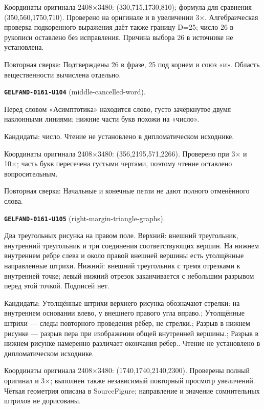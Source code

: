 Координаты оригинала 2408×3480: (330,715,1730,810); формула для сравнения (350,560,1750,710). Проверено на оригинале и в увеличении 3×. Алгебраическая проверка подкоренного выражения даёт также границу D=25; число 26 в рукописи оставлено без исправления. Причина выбора 26 в источнике не установлена.\par
Повторная сверка: Подтверждены 26 в фразе, 25 под корнем и союз «и». Область вещественности вычислена отдельно.\par\medskip
\par\noindent\leavevmode{}\label{GELFAND-0161-U104}\label{GELFAND-P001487:middle-cancelled-word}\textbf{\texttt{GELFAND-0161-U104}} (middle-cancelled-word).\nopagebreak[4]\par
Перед словом «Асимптотика» находится слово, густо зачёркнутое двумя наклонными линиями; нижние части букв похожи на «число».\par
Кандидаты: число. Чтение не установлено в дипломатическом исходнике.\par
Координаты оригинала 2408×3480: (356,2195,571,2266). Проверено при 3× и 10×; часть букв пересечена густыми чертами, поэтому чтение оставлено вопросительным.\par
Повторная сверка: Начальные и конечные петли не дают полного отменённого слова.\par\medskip
\par\noindent\leavevmode{}\label{GELFAND-0161-U105}\label{GELFAND-P001487:right-margin-triangle-graphs}\textbf{\texttt{GELFAND-0161-U105}} (right-margin-triangle-graphs).\nopagebreak[4]\par
Два треугольных рисунка на правом поле. Верхний: внешний треугольник, внутренний треугольник и три соединения соответствующих вершин. На нижнем внутреннем ребре слева и около правой внешней вершины есть утолщённые направленные штрихи. Нижний: внешний треугольник с тремя отрезками к внутренней точке; левый нижний отрезок заканчивается с небольшим разрывом перед этой точкой. Подписей нет.\par
Кандидаты: Утолщённые штрихи верхнего рисунка обозначают стрелки: на внутреннем основании влево, у внешнего правого угла вправо.; Утолщённые штрихи — следы повторного проведения рёбер, не стрелки.; Разрыв в нижнем рисунке — разрыв пера при изображении общей внутренней вершины.; Разрыв в нижнем рисунке намеренно различает окончания рёбер.. Чтение не установлено в дипломатическом исходнике.\par
Координаты оригинала 2408×3480: (1740,1740,2140,2300). Проверены полный оригинал и 3×; выполнен также независимый повторный просмотр увеличений. Чёткая геометрия описана в SourceFigure; направление и значение сомнительных штрихов не дорисованы.\par
